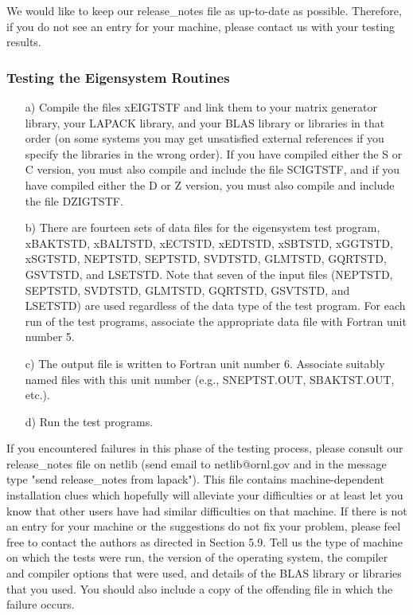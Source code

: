 We would like to keep our release\_notes file as up-to-date as possible.
Therefore, if you do not see an entry for your machine, please contact us
with your testing results.

\subsubsection{Testing the Eigensystem Routines}

\begin{itemize}

\item[a)]
Compile the files xEIGTSTF and link them to your matrix generator 
library, your LAPACK library, and your BLAS library or libraries
in that order (on some systems you may get
unsatisfied external references if you specify the libraries
in the wrong order).
If you have compiled either the S or C version,
you must also compile and include the file SCIGTSTF,
and if you have compiled either the D or Z version,
you must also compile and include the file DZIGTSTF.

\item[b)]
There are fourteen sets of data files for the eigensystem test program,
xBAKTSTD, xBALTSTD, xECTSTD, xEDTSTD, xSBTSTD, xGGTSTD, xSGTSTD,
NEPTSTD, SEPTSTD, SVDTSTD, GLMTSTD, GQRTSTD, GSVTSTD, and LSETSTD.
Note that seven of the input files (NEPTSTD, SEPTSTD, SVDTSTD, 
GLMTSTD, GQRTSTD, GSVTSTD, and LSETSTD) are
used regardless of the data type of the test program.
For each run of the test programs, associate the appropriate data file
with Fortran unit number 5.

\item[c)]
The output file is written to Fortran unit number 6.  Associate
suitably named files with this unit number 
(e.g., SNEPTST.OUT, SBAKTST.OUT, etc.).

\item[d)]
Run the test programs.
 
\end{itemize}

If you encountered failures in this phase of the testing process, please
consult our release\_notes file on netlib (send email to netlib@ornl.gov
and in the message type "send release\_notes from lapack").  This file
contains machine-dependent installation clues which hopefully will
alleviate your difficulties or at least let you know that other users
have had similar difficulties on that machine.  If there is not an entry
for your machine or the suggestions do not fix your problem, please feel
free to contact the authors as directed in Section 5.9.  Tell us the
type of machine on which the tests were run, the version of the operating
system, the compiler and compiler options that were used,
and details of the BLAS library or libraries that you used.  You should
also include a copy of the offending file in which the failure occurs.


